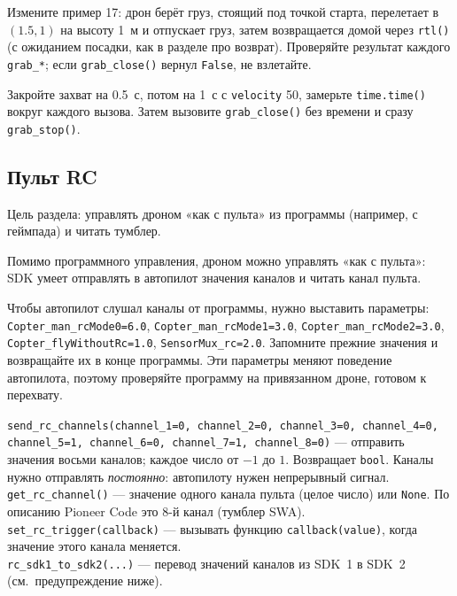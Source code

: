 \begin{taskbox}
Измените пример 17: дрон берёт груз, стоящий под точкой старта, перелетает в $(1.5, 1)$ на высоту 1~м и отпускает груз, затем возвращается домой через \verb|rtl()| (с ожиданием посадки, как в разделе про возврат). Проверяйте результат каждого \verb|grab_*|; если \verb|grab_close()| вернул \verb|False|, не взлетайте.
\end{taskbox}

\begin{taskbox}
Закройте захват на 0.5~с, потом на 1~с с \verb|velocity| 50, замерьте \verb|time.time()| вокруг каждого вызова. Затем вызовите \verb|grab_close()| без времени и сразу \verb|grab_stop()|.
\end{taskbox}

\subsection{Пульт RC}

Цель раздела: управлять дроном «как с пульта» из программы (например, с геймпада) и читать тумблер.

Помимо программного управления, дроном можно управлять «как с пульта»: SDK умеет отправлять в автопилот значения каналов и читать канал пульта.

\begin{alertbox}
Чтобы автопилот слушал каналы от программы, нужно выставить параметры: \texttt{Copter\_man\_rcMode0=6.0}, \texttt{Copter\_man\_rcMode1=3.0}, \texttt{Copter\_man\_rcMode2=3.0}, \texttt{Copter\_flyWithoutRc=1.0}, \texttt{SensorMux\_rc=2.0}. Запомните прежние значения и возвращайте их в конце программы. Эти параметры меняют поведение автопилота, поэтому проверяйте программу на привязанном дроне, готовом к перехвату.
\end{alertbox}

\begin{codebox}[Методы RC (по 0.11.0)]
\texttt{send\_rc\_channels(channel\_1=0, channel\_2=0, channel\_3=0, channel\_4=0, channel\_5=1, channel\_6=0, channel\_7=1, channel\_8=0)} --- отправить значения восьми каналов; каждое число от $-1$ до $1$. Возвращает \verb|bool|. Каналы нужно отправлять \emph{постоянно}: автопилоту нужен непрерывный сигнал.\\
\verb|get_rc_channel()| --- значение одного канала пульта (целое число) или \verb|None|. По описанию Pioneer Code это 8-й канал (тумблер SWA).\\
\verb|set_rc_trigger(callback)| --- вызывать функцию \verb|callback(value)|, когда значение этого канала меняется.\\
\verb|rc_sdk1_to_sdk2(...)| --- перевод значений каналов из SDK~1 в SDK~2 (см.\ предупреждение ниже).
\end{codebox}

